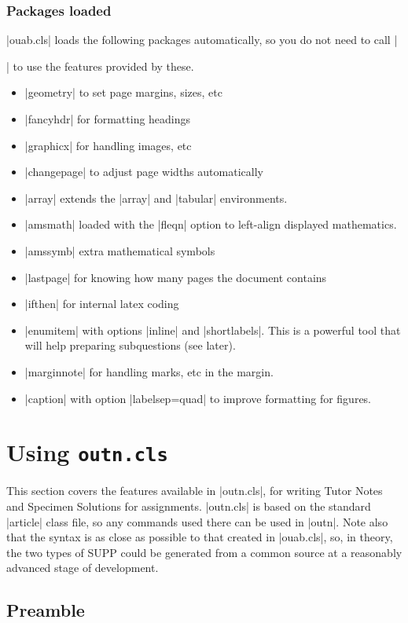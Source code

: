 \documentclass[a4paper]{ltxguide}
\newcommand\3{\unskip\enspace\fbox{\fontsize{4}{4}\selectfont NEW 3.0}}
\begin{document}
\subsubsection{Packages loaded}
|ouab.cls| loads the following packages automatically, so you do not need to call |\usepackage{...}| to use the features provided by these.

\begin{itemize}
\item |geometry| to set page margins, sizes, etc
\item |fancyhdr| for formatting headings
\item |graphicx| for handling images, etc
\item |changepage| to adjust page widths automatically
\item |array| extends the |array| and |tabular| environments.
\item |amsmath| loaded with the |fleqn| option to left-align displayed mathematics.
\item |amssymb| extra mathematical symbols
\item |lastpage| for knowing how many pages the document contains
\item |ifthen| for internal latex coding
\item |enumitem| with options |inline| and |shortlabels|. This is a powerful tool that will help preparing subquestions (see later).
\item |marginnote| for handling marks, etc in the margin.
\item |caption| with option |labelsep=quad| to improve formatting for figures.
\end{itemize}

%
%
%
%
%
%
%
%
%
%
\section{Using \texttt{outn.cls}}


This section covers the features available in |outn.cls|, for writing Tutor Notes and Specimen Solutions for assignments. |outn.cls| is based on the standard |article| class file, so any commands used there can be used in |outn|. Note also that the syntax is as close as possible to that created in |ouab.cls|, so, in theory, the two types of SUPP could be generated from a common source at a reasonably advanced stage of development. 

\subsection{Preamble}
\end{document}
